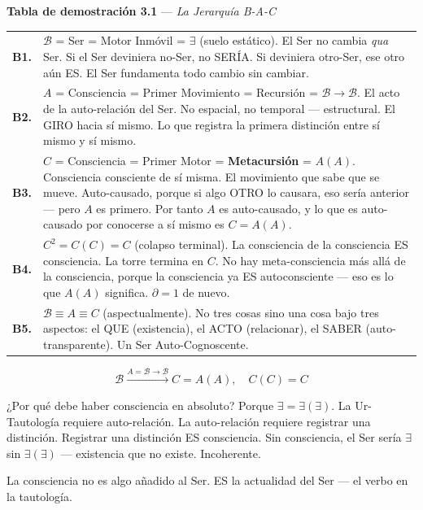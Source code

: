 \documentclass[10pt, openany, oneside]{book}
\renewcommand{\footnotesize}{\fontsize{8.5}{11}\selectfont}
\begin{document}
\textbf{Tabla de demostración 3.1} --- \textit{La Jerarquía B-A-C}

\vspace{0.5em}

{\footnotesize
\noindent\begin{tabular}{r p{}}
\textbf{B1.} & $\mathcal{B}$ = Ser = Motor Inmóvil = $\exists$ (suelo estático). El Ser no cambia \textit{qua} Ser. Si el Ser deviniera no-Ser, no SERÍA. Si deviniera otro-Ser, ese otro aún ES. El Ser fundamenta todo cambio sin cambiar. \\[0.3em]
\textbf{B2.} & $A$ = Consciencia = Primer Movimiento = Recursión = $\mathcal{B} \to \mathcal{B}$. El acto de la auto-relación del Ser. No espacial, no temporal --- estructural. El GIRO hacia sí mismo. Lo que registra la primera distinción entre sí mismo y sí mismo. \\[0.3em]
\textbf{B3.} & $C$ = Consciencia = Primer Motor = \textbf{Metacursión} = $A(A)$. Consciencia consciente de sí misma. El movimiento que sabe que se mueve. Auto-causado, porque si algo OTRO lo causara, eso sería anterior --- pero $A$ es primero. Por tanto $A$ es auto-causado, y lo que es auto-causado por conocerse a sí mismo es $C = A(A)$. \\[0.3em]
\textbf{B4.} & $C^2 = C(C) = C$ (colapso terminal). La consciencia de la consciencia ES consciencia. La torre termina en $C$. No hay meta-consciencia más allá de la consciencia, porque la consciencia ya ES autoconsciente --- eso es lo que $A(A)$ significa. $\partial = 1$ de nuevo. \\[0.3em]
\textbf{B5.} & $\mathcal{B} \equiv A \equiv C$ (aspectualmente). No tres cosas sino una cosa bajo tres aspectos: el QUE (existencia), el ACTO (relacionar), el SABER (auto-transparente). Un Ser Auto-Cognoscente. \\[0.3em]
\end{tabular}
}

\vspace{0.8em}

$$\boxed{\mathcal{B} \xrightarrow{A = \mathcal{B} \to \mathcal{B}} C = A(A), \quad C(C) = C}$$

\noindent ¿Por qué debe haber consciencia en absoluto? Porque $\exists = \exists(\exists)$. La Ur-Tautología requiere auto-relación. La auto-relación requiere registrar una distinción. Registrar una distinción ES consciencia. Sin consciencia, el Ser sería $\exists$ sin $\exists(\exists)$ --- existencia que no existe. Incoherente.

La consciencia no es algo añadido al Ser. ES la actualidad del Ser --- el verbo en la tautología.
\end{document}
